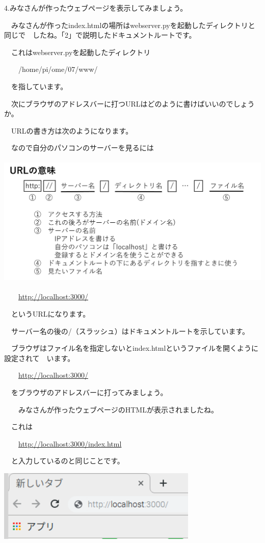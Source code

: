 \documentclass[a4paper,12pt,dvipdfmx]{jarticle}
\begin{document}
\bigskip

4.みなさんが作ったウェブページを表示してみましょう。

\ \ みなさんが作ったindex.htmlの場所はwebserver.pyを起動したディレクトリと同じで\ \ したね。「2」で説明したドキュメントルートです。

\ \ これはwebserver.pyを起動したディレクトリ

\ \ 　/home/pi/ome/07/www/

\ \ を指しています。


\bigskip

\ \ 次にブラウザのアドレスバーに打つURLはどのように書けばいいのでしょうか。

\ \ URLの書き方は次のようになります。

\ \ なので自分のパソコンのサーバーを見るには

\centering
\includegraphics[width=13.894cm,height=6.346cm]{ome7-img040.png}
\flushleft

\ \ 　\url{http://localhost:3000/}

\ \ というURLになります。

\ \ サーバー名の後の/（スラッシュ）はドキュメントルートを示しています。

\ \ ブラウザはファイル名を指定しないとindex.htmlというファイルを開くように設定されて\ \ います。

\ \ 　\url{http://localhost:3000/}

\ \ をブラウザのアドレスバーに打ってみましょう。

　\ \ みなさんが作ったウェブページのHTMLが表示されましたね。

\ \ これは

\ \ 　\url{http://localhost:3000/index.html}

\ \ と入力しているのと同じことです。



\centering
\includegraphics[width=9.551cm,height=3.427cm]{ome7-img041.png}
\flushleft
\end{document}
